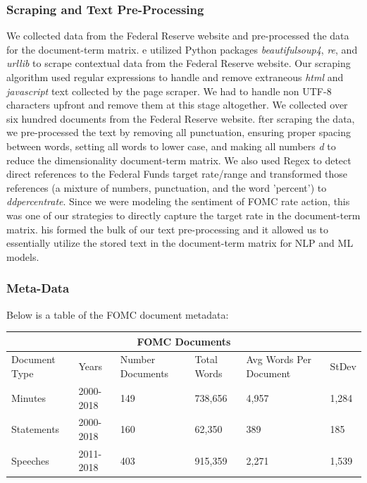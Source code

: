 \documentclass[11pt]{article}
\newcommand{\vertSpace}[1]{\vspace{3mm}}
\begin{document}
{\subsubsection{Scraping and Text Pre-Processing}

We collected data from the Federal Reserve website and pre-processed the data for the document-term matrix. \vertSpace


We utilized Python packages \textit{beautifulsoup4}, \textit{re}, and \textit{urllib} to scrape contextual data from the Federal Reserve website.  Our scraping algorithm used regular expressions to handle and remove extraneous \textit{html} and \textit{javascript} text collected by the page scraper.  We had to handle non UTF-8 characters upfront and remove them at this stage altogether.  We collected over six hundred documents from the Federal Reserve website. \vertSpace


After scraping the data, we pre-processed the text by removing all punctuation, ensuring proper spacing between words, setting all words to lower case, and making all numbers \textit{d} to reduce the dimensionality document-term matrix.  We also used Regex to detect direct references to the Federal Funds target rate/range and transformed those references (a mixture of numbers, punctuation, and the word 'percent') to \textit{ddpercentrate}.  Since we were modeling the sentiment of FOMC rate action, this was one of our strategies to directly capture the target rate in the document-term matrix. \vertSpace


This formed the bulk of our text pre-processing and it allowed us to essentially utilize the stored text in the document-term matrix for NLP and ML models. 

\subsubsection{Meta-Data}
\noindent Below is a table of the FOMC document metadata: 

\vertSpace

\noindent \begin{tabular}{ |p{2cm}||p{2cm}|p{2cm}|p{2cm}|p{2cm}|p{2cm}|  }
 \hline
 \multicolumn{6}{|c|}{FOMC Documents} \\
 \hline
 Document Type& Years & Number Documents & Total Words & Avg Words Per Document & StDev\\
 \hline
 Minutes   & 2000-2018    & 149 & 738,656 & 4,957 & 1,284\\
 Statements &   2000-2018  & 160   & 62,350 & 389 & 185\\
 Speeches & 2011-2018 & 403 & 915,359 & 2,271 & 1,539\\
 \hline
\end{tabular}

}
\end{document}

